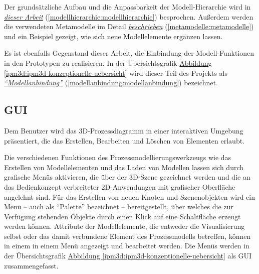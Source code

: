 \documentclass[a4paper,10pt]{sphinxmanual}
\begin{document}
Der grundsätzliche Aufbau und die Anpassbarkeit der Modell-Hierarchie wird in {\hyperref[modellhierarchie:modellhierarchie]{\emph{dieser Arbeit}}} (\autoref*{modellhierarchie:modellhierarchie}) besprochen.
Außerdem werden die verwendeten Metamodelle im Detail {\hyperref[metamodelle:metamodelle]{\emph{beschrieben}}} (\autoref*{metamodelle:metamodelle}) und ein Beispiel gezeigt, wie sich neue Modellelemente ergänzen lassen.

Es ist ebenfalls Gegenstand dieser Arbeit, die Einbindung der Modell-Funktionen in den Prototypen zu realisieren.
In der Übersichtsgrafik \hyperref[ipm3d:ipm3d-konzeptionelle-uebersicht]{Abbildung  \ref*{ipm3d:ipm3d-konzeptionelle-uebersicht}} wird dieser Teil des Projekts als {\hyperref[modellanbindung:modellanbindung]{\emph{"`Modellanbindung"'}}} (\autoref*{modellanbindung:modellanbindung}) bezeichnet.


\subsection{GUI}
\label{ipm3d:gui}\label{ipm3d:ipm3d-gui}
Dem Benutzer wird das 3D-Prozessdiagramm in einer interaktiven Umgebung präsentiert, die das Erstellen, Bearbeiten und Löschen von Elementen erlaubt.

Die verschiedenen Funktionen des Prozessmodellierungswerkzeugs wie das Erstellen von Modellelementen und das Laden von Modellen lassen sich durch grafische Menüs aktivieren, die über der 3D-Szene gezeichnet werden und die an das Bedienkonzept verbreiteter 2D-Anwendungen mit grafischer Oberfläche angelehnt sind.
Für das Erstellen von neuen Knoten und Szenenobjekten wird ein Menü – auch als "`Palette"' bezeichnet – bereitgestellt, über welches die zur Verfügung stehenden Objekte durch einen Klick auf eine Schaltfläche erzeugt werden können.
Attribute der Modellelemente, die entweder die Visualisierung selbst oder das damit verbundene Element des Prozessmodells betreffen, können in einem in einem Menü angezeigt und bearbeitet werden.
Die Menüs werden in der Übersichtsgrafik \hyperref[ipm3d:ipm3d-konzeptionelle-uebersicht]{Abbildung  \ref*{ipm3d:ipm3d-konzeptionelle-uebersicht}} als GUI zusammengefasst.
\end{document}
